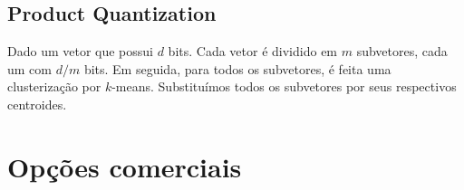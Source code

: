 \subsection{Product Quantization}

Dado um vetor que possui $d$ bits. Cada vetor é dividido em $m$ subvetores, cada um com $d/m$ bits. Em seguida, para todos os subvetores, é feita uma clusterização por $k$-means. Substituímos todos os subvetores por seus respectivos centroides.


\section{Opções comerciais}





\printbibliography